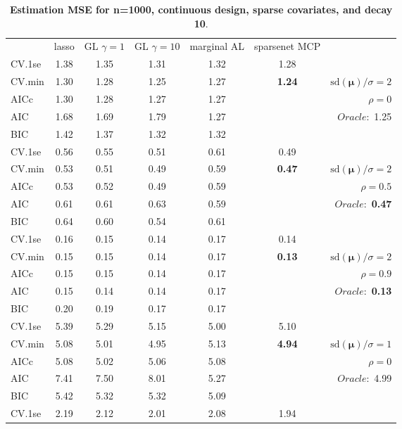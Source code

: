 \begin{table}\vspace{-.5cm}
\caption[l]{ { \bf Estimation MSE for n=1000, continuous design, 
sparse covariates, and  decay  10}.}
\vspace{-.5cm}
\footnotesize{}
\begin{center}
\begin{tabular}{l*{5}{c}|r}
& lasso & GL $\gamma=1$ & GL $\gamma=10$ & marginal AL & sparsenet MCP  & \\
 \cline{1-7}
CV.1se & 1.38 & 1.35 & 1.31 & 1.32 & 1.28 & \\
CV.min & 1.30 & 1.28 & 1.25 & 1.27 & {\bf 1.24} &  $\mathrm{sd}(\mathbf{\mu})/\sigma=2$ \\
AICc & 1.30 & 1.28 & 1.27 & 1.27 & & $\rho=0$ \\
AIC & 1.68 & 1.69 & 1.79 & 1.27 & &  \multirow{2}{*}{$Oracle: $ 1.25} \\
BIC & 1.42 & 1.37 & 1.32 & 1.32 & &  \\
 \hline 
CV.1se & 0.56 & 0.55 & 0.51 & 0.61 & 0.49 & \\
CV.min & 0.53 & 0.51 & 0.49 & 0.59 & {\bf 0.47} &  $\mathrm{sd}(\mathbf{\mu})/\sigma=2$ \\
AICc & 0.53 & 0.52 & 0.49 & 0.59 & & $\rho=0.5$ \\
AIC & 0.61 & 0.61 & 0.63 & 0.59 & &  \multirow{2}{*}{$Oracle: $ {\bf 0.47}} \\
BIC & 0.64 & 0.60 & 0.54 & 0.61 & &  \\
 \hline 
CV.1se & 0.16 & 0.15 & 0.14 & 0.17 & 0.14 & \\
CV.min & 0.15 & 0.15 & 0.14 & 0.17 & {\bf 0.13} &  $\mathrm{sd}(\mathbf{\mu})/\sigma=2$ \\
AICc & 0.15 & 0.15 & 0.14 & 0.17 & & $\rho=0.9$ \\
AIC & 0.15 & 0.14 & 0.14 & 0.17 & &  \multirow{2}{*}{$Oracle: $ {\bf 0.13}} \\
BIC & 0.20 & 0.19 & 0.17 & 0.17 & &  \\
 \hline 
CV.1se & 5.39 & 5.29 & 5.15 & 5.00 & 5.10 & \\
CV.min & 5.08 & 5.01 & 4.95 & 5.13 & {\bf 4.94} &  $\mathrm{sd}(\mathbf{\mu})/\sigma=1$ \\
AICc & 5.08 & 5.02 & 5.06 & 5.08 & & $\rho=0$ \\
AIC & 7.41 & 7.50 & 8.01 & 5.27 & &  \multirow{2}{*}{$Oracle: $ 4.99} \\
BIC & 5.42 & 5.32 & 5.32 & 5.09 & &  \\
 \hline 
CV.1se & 2.19 & 2.12 & 2.01 & 2.08 & 1.94 & \\

\end{tabular}
\end{center}
\end{table}
